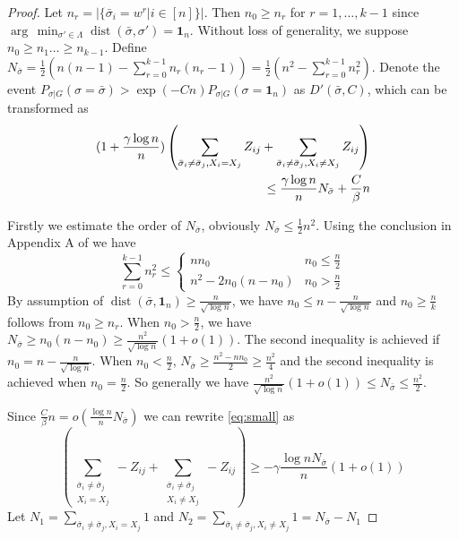 \documentclass[entropy,article,submit,moreauthors,pdftex]{Definitions/mdpi}
\newcommand{\1}{\mathbbm{1}}
\DeclareMathOperator{\Dist}{dist}
\begin{document}
\begin{proof}
	Let $n_r = |\{\bar{\sigma}_i = w^r | i\in [n] \}|$. Then $n_0 \geq n_r$ for $r=1, \dots, k-1$ since  $\arg\,\min_{\sigma'\in \Lambda} \Dist(\bar{\sigma}, \sigma') = \mathbf{1}_n$.
	Without loss of generality,
	we suppose $n_0 \geq n_1 \dots \geq n_{k-1}$.
	Define $N_{\bar{\sigma}} = \frac{1}{2}(n(n-1) - \sum_{r=0}^{k-1} n_r(n_r-1))
	=\frac{1}{2}(n^2 - \sum_{r=0}^{k-1} n_r^2)$.
	Denote the event $P_{\sigma | G}(\sigma = \bar{\sigma} ) > \exp(-Cn) P_{\sigma | G}(\sigma = \mathbf{1}_n)$ as $D'(\bar{\sigma}, C)$,
	which can be transformed as
	\begin{align}
	(1 + \frac{\gamma \log n}{n})
	\left( \sum_{\bar{\sigma}_i  \neq \bar{\sigma}_j, X_i = X_j} Z_{ij} +
	\sum_{\bar{\sigma}_i  \neq \bar{\sigma}_j, X_i \neq X_j} Z_{ij} \right)\notag\\
	\leq \frac{\gamma \log n}{n} N_{\bar{\sigma}} + \frac{C}{\beta} n\label{eq:small}
	\end{align}
		
	Firstly we estimate the order of $N_{\bar{\sigma}}$, obviously $N_{\bar{\sigma}} \leq \frac{1}{2} n^2$.
	Using the conclusion in Appendix A of \cite{chen2016information} we have
	\begin{equation}
	\sum_{r=0}^{k-1} n_r^2 \leq
	\begin{cases}
	n n_0 & n_0 \leq \frac{n}{2} \\
	n^2 - 2n_0(n-n_0) & n_0 > \frac{n}{2}
	\end{cases}
	\end{equation}
	By assumption of $\Dist(\bar{\sigma}, \mathbf{1}_n) \geq \frac{n}{\sqrt{\log n}}$, we have $n_0 \leq n - \frac{n}{\sqrt{\log n}}$
	and $n_0 \geq \frac{n}{k}$ follows from $n_0 \geq n_r$.
	When $n_0 > \frac{n}{2}$,
	we have $N_{\bar{\sigma}} \geq n_0 (n - n_0) \geq \frac{n^2}{\sqrt{\log n}}(1+o(1))$.
	The second inequality is achieved if $n_0 = n - \frac{n}{\sqrt{\log n}}$.
	When $n_0 < \frac{n}{2}$,
	$N_{\bar{\sigma}} \geq \frac{n^2 - nn_0}{2} \geq \frac{n^2}{4}$ and the second inequality is achieved when $n_0 = \frac{n}{2}$.
	So generally we have $\frac{n^2}{\sqrt{\log n}}(1+o(1)) \leq N_{\bar{\sigma}} \leq \frac{n^2}{2}$.
	
	Since $\frac{C}{\beta} n = o(\frac{\log n}{n} N_{\bar{\sigma}})$ we can rewrite \eqref{eq:small} as
	\begin{equation}
	\left( \sum_{\substack{\bar{\sigma}_i  \neq \bar{\sigma}_j \\ X_i = X_j}} -Z_{ij}
	+ \sum_{\substack{\bar{\sigma}_i  \neq \bar{\sigma}_j \\ X_i \neq X_j}} -Z_{ij} \right)\geq -\gamma\frac{\log n N_{\bar{\sigma}}}{n}(1+o(1))
	\end{equation}
	Let $N_1 = \sum_{\bar{\sigma}_i  \neq \bar{\sigma}_j, X_i = X_j} 1$
	and $N_2 = \sum_{\bar{\sigma}_i  \neq \bar{\sigma}_j, X_i \neq X_j} 1 = N_{\bar{\sigma}} - N_1$
	

\end{proof}
\end{document}
